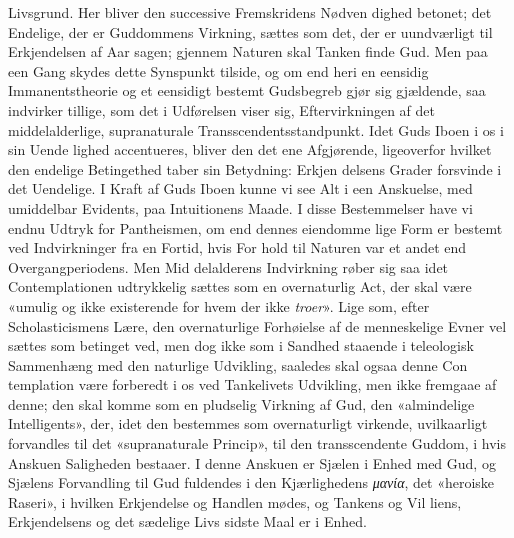 \documentclass[12pt,a4paper]{book}
\newcommand{\gk}[1]{\textit{#1}}
\begin{document}
Livsgrund. Her bliver den successive Fremskridens Nødven\-%
dighed betonet; det Endelige, der er Guddommens Virkning,
sættes som det, der er uundværligt til Erkjendelsen af Aar\-%
sagen; gjennem Naturen skal Tanken finde Gud. Men paa
een Gang skydes dette Synspunkt tilside, og om end heri en
eensidig Immanentstheorie og et eensidigt bestemt Gudsbegreb
gjør sig gjældende, saa indvirker tillige, som det i Udførelsen
viser sig, Eftervirkningen af det middelalderlige, supranaturale
Transscendentsstandpunkt. Idet Guds Iboen i os i sin Uende\-%
lighed accentueres, bliver den det ene Afgjørende, ligeoverfor
hvilket den endelige Betingethed taber sin Betydning: Erkjen\-%
delsens Grader forsvinde i det Uendelige. I Kraft af Guds
Iboen kunne vi see Alt i een Anskuelse, med umiddelbar
Evidents, paa Intuitionens Maade. I disse Bestemmelser have
vi endnu Udtryk for Pantheismen, om end dennes eiendomme\-%
lige Form er bestemt ved Indvirkninger fra en Fortid, hvis For\-%
hold til Naturen var et andet end Overgangperiodens. Men Mid\-%
delalderens Indvirkning røber sig saa idet Contemplationen
udtrykkelig sættes som en overnaturlig Act, der skal være
«umulig og ikke existerende for hvem der ikke \emph{troer}». Lige\-%
som, efter Scholasticismens Lære, den overnaturlige Forhøielse
af de menneskelige Evner vel sættes som betinget ved, men
dog ikke som i Sandhed staaende i teleologisk Sammenhæng
med den naturlige Udvikling, saaledes skal ogsaa denne Con\-%
templation være forberedt i os ved Tankelivets Udvikling, men
ikke fremgaae af denne; den skal komme som en pludselig
Virkning af Gud, den «almindelige Intelligents», der, idet den
bestemmes som overnaturligt virkende, uvilkaarligt forvandles
til det «supranaturale Princip», til den transscendente Guddom,
i hvis Anskuen Saligheden bestaaer. I denne Anskuen er
Sjælen i Enhed med Gud, og Sjælens Forvandling til Gud
fuldendes i den Kjærlighedens \gk{μανία}, det «heroiske Raseri», i
hvilken Erkjendelse og Handlen mødes, og Tankens og Vil\-%
liens, Erkjendelsens og det sædelige Livs sidste Maal er i
Enhed.
\end{document}
